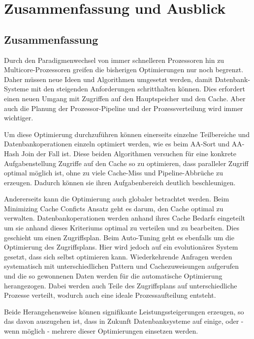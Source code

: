 \chapter{Zusammenfassung und Ausblick}
\label{sec:Zusammenfassung-Ausblick}

\section{Zusammenfassung}
\label{sec:Zusammenfassung}

Durch den Paradigmenwechsel von immer schnelleren Prozessoren hin zu Multicore-Prozessoren greifen die bisherigen Optimierungen nur noch begrenzt. Daher müssen neue Ideen und Algorithmen umgesetzt werden, damit Datenbank-Systeme mit den steigenden Anforderungen schritthalten können. Dies erfordert einen neuen Umgang mit Zugriffen auf den Hauptspeicher und den Cache. Aber auch die Planung der Prozessor-Pipeline und der Prozessverteilung wird immer wichtiger.

Um diese Optimierung durchzuführen können einerseits einzelne Teilbereiche und Datenbankoperationen einzeln optimiert werden, wie es beim AA-Sort und AA-Hash Join der Fall ist. Diese beiden Algorithmen versuchen für eine konkrete Aufgabenstellung Zugriffe auf den Cache so zu optimieren, dass paralleler Zugriff optimal möglich ist, ohne zu viele Cache-Miss und Pipeline-Abbrüche zu erzeugen. Dadurch können sie ihren Aufgabenbereich deutlich beschleunigen.

Andererseits kann die Optimierung auch globaler betrachtet werden. Beim Minimizing Cache Conficts Ansatz geht es darum, den Cache optimal zu verwalten. Datenbankoperationen werden anhand ihres Cache Bedarfs eingeteilt um sie anhand dieses Kriteriums optimal zu verteilen und zu bearbeiten. Dies geschieht um einen Zugriffsplan. Beim Auto-Tuning geht es ebenfalls um die Optimierung des Zugriffsplans. Hier wird jedoch auf ein evolutionäres System gesetzt, dass sich selbst optimieren kann. Wiederkehrende Anfragen werden systematisch mit unterschiedlichen Pattern und Cachezuweisungen aufgerufen und die so gewonnenen Daten werden für die automatische Optimierung herangezogen. Dabei werden auch Teile des Zugriffsplans auf unterschiedliche Prozesse verteilt, wodurch auch eine ideale Prozessaufteilung entsteht.

Beide Herangehensweise können signifikante Leistungssteigerungen erzeugen, so das davon auszugehen ist, dass in Zukunft Datenbanksysteme auf einige, oder - wenn möglich - mehrere dieser Optimierungen einsetzen werden.


